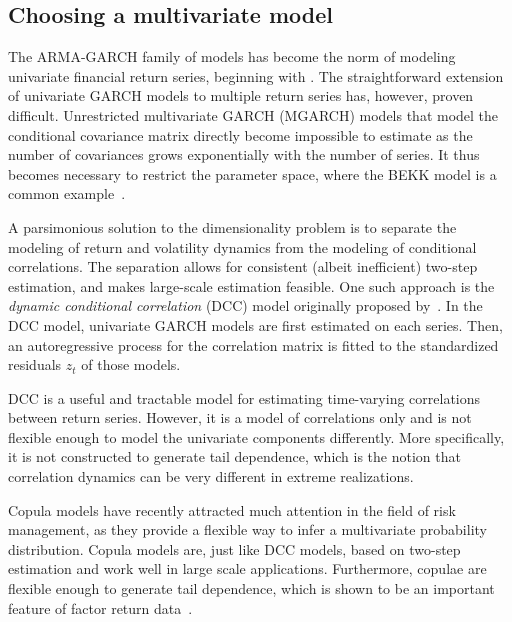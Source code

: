 
\subsection{Choosing a multivariate model}
\label{sub:05_01_choosing}
The ARMA-GARCH family of models has become the norm of modeling univariate financial return series, beginning with \textcite{Bollerslev1986}. The straightforward extension of univariate GARCH models to multiple return series has, however, proven difficult. Unrestricted multivariate GARCH (MGARCH) models that model the conditional covariance matrix directly become impossible to estimate as the number of covariances grows exponentially with the number of series. It thus becomes necessary to restrict the parameter space, where the BEKK model is a common example~\autocite{BEKKModel}.

A parsimonious solution to the dimensionality problem is to separate the modeling of return and volatility dynamics from the modeling of conditional correlations. The separation allows for consistent (albeit inefficient) two-step estimation, and makes large-scale estimation feasible. One such approach is the \emph{dynamic conditional correlation} (DCC) model originally proposed by~\autocite{Engle2002}. In the DCC model, univariate GARCH models are first estimated on each series. Then, an autoregressive process for the correlation matrix is fitted to the standardized residuals ${z_t}$ of those models. 

DCC is a useful and tractable model for estimating time-varying correlations between return series. However, it is a model of correlations only and is not flexible enough to model the univariate components differently. More specifically, it is not constructed to generate tail dependence, which is the notion that correlation dynamics can be very different in extreme realizations. 

Copula models have recently attracted much attention in the field of risk management, as they provide a flexible way to infer a multivariate probability distribution. Copula models are, just like DCC models, based on two-step estimation and work well in large scale applications. Furthermore, copulae are flexible enough to generate tail dependence, which is shown to be an important feature of factor return data~\autocite{ChristoffersenLanglois2013}. 

